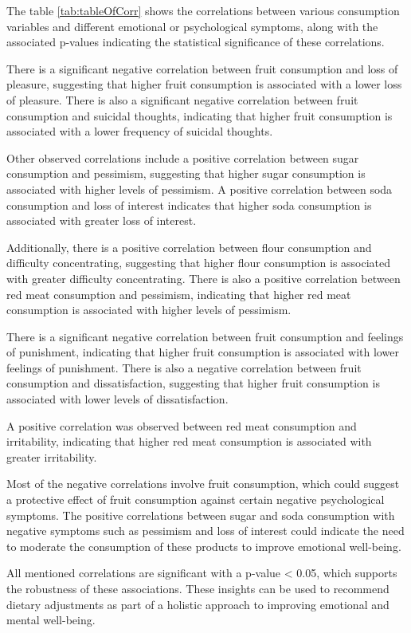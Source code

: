 \documentclass[jou]{apa7}
\begin{document}
The table \ref{tab:tableOfCorr} shows the correlations between various consumption variables and different emotional or psychological symptoms, along with the associated p-values indicating the statistical significance of these correlations.

There is a significant negative correlation between fruit consumption and loss of pleasure, suggesting that higher fruit consumption is associated with a lower loss of pleasure. There is also a significant negative correlation between fruit consumption and suicidal thoughts, indicating that higher fruit consumption is associated with a lower frequency of suicidal thoughts.

Other observed correlations include a positive correlation between sugar consumption and pessimism, suggesting that higher sugar consumption is associated with higher levels of pessimism. A positive correlation between soda consumption and loss of interest indicates that higher soda consumption is associated with greater loss of interest.

Additionally, there is a positive correlation between flour consumption and difficulty concentrating, suggesting that higher flour consumption is associated with greater difficulty concentrating. There is also a positive correlation between red meat consumption and pessimism, indicating that higher red meat consumption is associated with higher levels of pessimism.

There is a significant negative correlation between fruit consumption and feelings of punishment, indicating that higher fruit consumption is associated with lower feelings of punishment. There is also a negative correlation between fruit consumption and dissatisfaction, suggesting that higher fruit consumption is associated with lower levels of dissatisfaction.

A positive correlation was observed between red meat consumption and irritability, indicating that higher red meat consumption is associated with greater irritability.

Most of the negative correlations involve fruit consumption, which could suggest a protective effect of fruit consumption against certain negative psychological symptoms. The positive correlations between sugar and soda consumption with negative symptoms such as pessimism and loss of interest could indicate the need to moderate the consumption of these products to improve emotional well-being.

All mentioned correlations are significant with a p-value \textless{} 0.05, which supports the robustness of these associations. These insights can be used to recommend dietary adjustments as part of a holistic approach to improving emotional and mental well-being.
\end{document}
